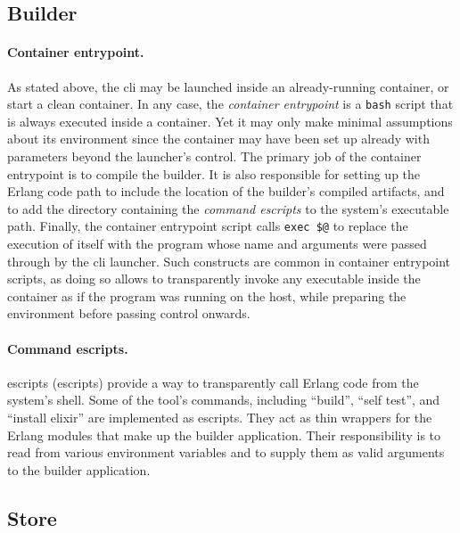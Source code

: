 \subsection{Builder}

\paragraph{Container entrypoint.} As stated above, the \acrshort{cli} may be launched inside an already-running container, or start a clean container. In any case, the \emph{container entrypoint} is a \lstinline|bash| script that is always executed inside a container. Yet it may only make minimal assumptions about its environment since the container may have been set up already with parameters beyond the launcher's control. The primary job of the container entrypoint is to compile the builder. It is also responsible for setting up the Erlang code path to include the location of the builder's compiled artifacts, and to add the directory containing the \emph{command \acrshort{escript}s} to the system's executable path. Finally, the container entrypoint script calls \lstinline|exec $@| to replace the execution of itself with the program whose name and arguments were passed through by the \acrshort{cli} launcher. Such constructs are common in container entrypoint scripts, as doing so allows to transparently invoke any executable inside the container as if the program was running on the host, while preparing the environment before passing control onwards.

\paragraph{Command escripts.} \acrlong{escript}s (\acrshort{escript}s) provide a way to transparently call Erlang code from the system's shell. Some of the tool's commands, including ``build'', ``self test'', and ``install elixir'' are implemented as \acrshort{escript}s. They act as thin wrappers for the Erlang modules that make up the builder application. Their responsibility is to read from various environment variables and to supply them as valid arguments to the builder application.

\subsection{Store}
